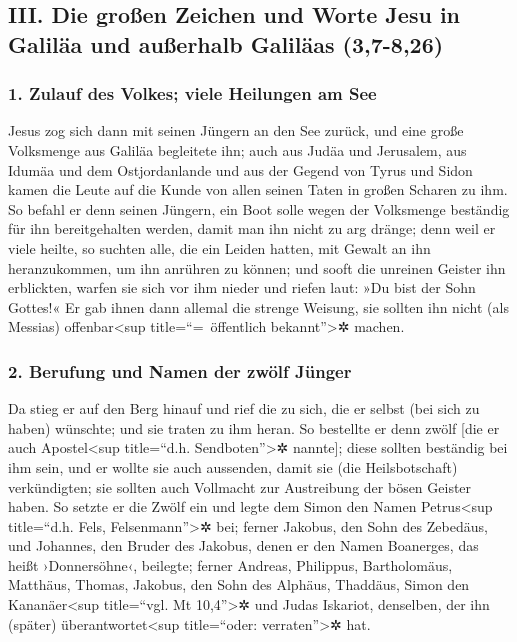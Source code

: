 \hypertarget{iii.-die-grouxdfen-zeichen-und-worte-jesu-in-galiluxe4a-und-auuxdferhalb-galiluxe4as-37-826}{%
\subsection{III. Die großen Zeichen und Worte Jesu in Galiläa und
außerhalb Galiläas
(3,7-8,26)}\label{iii.-die-grouxdfen-zeichen-und-worte-jesu-in-galiluxe4a-und-auuxdferhalb-galiluxe4as-37-826}}

\hypertarget{zulauf-des-volkes-viele-heilungen-am-see}{%
\subsubsection{1. Zulauf des Volkes; viele Heilungen am
See}\label{zulauf-des-volkes-viele-heilungen-am-see}}

 Jesus zog sich dann mit seinen Jüngern an den See zurück,
und eine große Volksmenge aus Galiläa begleitete ihn; auch aus Judäa
 und Jerusalem, aus Idumäa und dem Ostjordanlande und aus
der Gegend von Tyrus und Sidon kamen die Leute auf die Kunde von allen
seinen Taten in großen Scharen zu ihm.  So befahl er denn
seinen Jüngern, ein Boot solle wegen der Volksmenge beständig für ihn
bereitgehalten werden, damit man ihn nicht zu arg dränge;
 denn weil er viele heilte, so suchten alle, die ein
Leiden hatten, mit Gewalt an ihn heranzukommen, um ihn anrühren zu
können;  und sooft die unreinen Geister ihn erblickten,
warfen sie sich vor ihm nieder und riefen laut: »Du bist der Sohn
Gottes!«  Er gab ihnen dann allemal die strenge Weisung,
sie sollten ihn nicht (als Messias) offenbar\textless sup
title=``=~öffentlich bekannt''\textgreater✲ machen.

\hypertarget{berufung-und-namen-der-zwuxf6lf-juxfcnger}{%
\subsubsection{2. Berufung und Namen der zwölf
Jünger}\label{berufung-und-namen-der-zwuxf6lf-juxfcnger}}

 Da stieg er auf den Berg hinauf und rief die zu sich,
die er selbst (bei sich zu haben) wünschte; und sie traten zu ihm heran.
 So bestellte er denn zwölf {[}die er auch
Apostel\textless sup title=``d.h. Sendboten''\textgreater✲ nannte{]};
diese sollten beständig bei ihm sein, und er wollte sie auch aussenden,
damit sie (die Heilsbotschaft) verkündigten;  sie sollten
auch Vollmacht zur Austreibung der bösen Geister haben. 
So setzte er die Zwölf ein und legte dem Simon den Namen
Petrus\textless sup title=``d.h. Fels, Felsenmann''\textgreater✲ bei;
 ferner Jakobus, den Sohn des Zebedäus, und Johannes, den
Bruder des Jakobus, denen er den Namen Boanerges, das heißt
›Donnersöhne‹, beilegte;  ferner Andreas, Philippus,
Bartholomäus, Matthäus, Thomas, Jakobus, den Sohn des Alphäus, Thaddäus,
Simon den Kananäer\textless sup title=``vgl. Mt 10,4''\textgreater✲
 und Judas Iskariot, denselben, der ihn (später)
überantwortet\textless sup title=``oder: verraten''\textgreater✲ hat.

